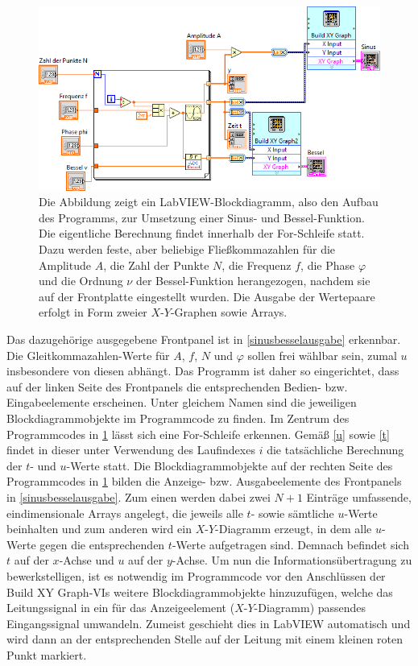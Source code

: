 \documentclass[
a4paper,
12pt,
pagesize,
ngerman
]{scrartcl}
\begin{document}
	\begin{figure}[H]
		\centering
		\includegraphics[width=1.0\textwidth]{EIRE2018Dateien/Tag1/sinusbessel-bilder/SinusBesseld}
		\caption{Die Abbildung zeigt ein LabVIEW-Blockdiagramm, also den Aufbau des Programms, zur Umsetzung einer Sinus- und Bessel-Funktion. Die eigentliche Berechnung findet innerhalb der For-Schleife statt. Dazu werden feste, aber beliebige Fließkommazahlen für die Amplitude $A$, die Zahl der Punkte $N$, die Frequenz $f$, die Phase $\varphi$ und die Ordnung $\nu$ der Bessel-Funktion herangezogen, nachdem sie auf der Frontplatte eingestellt wurden. Die Ausgabe der Wertepaare erfolgt in Form zweier $X$-$Y$-Graphen sowie Arrays.}
		\label{sinusbesselprogrammcode}
	\end{figure}

	\noindent Das dazugehörige ausgegebene Frontpanel ist in \cref{sinusbesselausgabe} erkennbar. Die Gleitkommazahlen-Werte für $A$, $f$, $N$ und $\varphi$ sollen frei wählbar sein, zumal $u$ insbesondere von diesen abhängt. Das Programm ist daher so eingerichtet, dass auf der linken Seite des Frontpanels die entsprechenden Bedien- bzw. Eingabeelemente erscheinen. Unter gleichem Namen sind die jeweiligen Blockdiagrammobjekte im Programmcode zu finden. Im Zentrum des Programmcodes in \cref{sinusbesselprogrammcode} lässt sich eine For-Schleife erkennen. Gemäß \cref{u} sowie \cref{t} findet in dieser unter Verwendung des Laufindexes $i$ die tatsächliche Berechnung der $t$- und $u$-Werte statt. Die Blockdiagrammobjekte auf der rechten Seite des Programmcodes in \cref{sinusbesselprogrammcode} bilden die Anzeige- bzw. Ausgabeelemente des Frontpanels in \cref{sinusbesselausgabe}. Zum einen werden dabei zwei $N+1$ Einträge umfassende, eindimensionale Arrays angelegt, die jeweils alle $t$- sowie sämtliche $u$-Werte beinhalten und zum anderen wird ein $X$-$Y$-Diagramm erzeugt, in dem alle $u$-Werte gegen die entsprechenden $t$-Werte aufgetragen sind.
	Demnach befindet sich $t$ auf der $x$-Achse und $u$ auf der $y$-Achse. %
	Um nun die Informationsübertragung zu bewerkstelligen, ist es notwendig im Programmcode vor den Anschlüssen der \glqq Build XY Graph\grqq -VIs weitere Blockdiagrammobjekte hinzuzufügen, welche das Leitungssignal in ein für das Anzeigeelement ($X$-$Y$-Diagramm) passendes Eingangssignal umwandeln. Zumeist geschieht dies in LabVIEW automatisch und wird dann an der entsprechenden Stelle auf der Leitung mit einem kleinen roten Punkt markiert.
\end{document}
